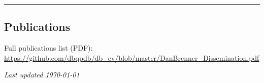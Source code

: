 \documentclass{article}
\begin{document}
\vspace{0.8em}
\noindent\rule{\textwidth}{0.4pt}

\subsection*{Publications}
\vspace{-0.6em}
\noindent\small Full publications list (PDF): \url{https://github.com/dbqpdb/db_cv/blob/master/DanBrenner_Dissemination.pdf}

\vfill
\begin{center}
\small\textit{Last updated \today}
\end{center}


\nocite{warner2025non}
\end{document}
